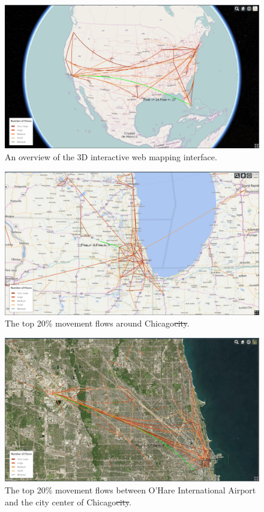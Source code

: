 \documentclass[ijgi,article,accept,moreauthors,pdftex,10pt,a4paper]{mdpi}
\theoremstyle{mdpi}
\newcounter{re}
\theoremstyle{mdpidefinition}
\providecommand{\DIFadd}[1]{{\protect\color{blue}\uwave{#1}}} %
\providecommand{\DIFdel}[1]{{\protect\color{red}\sout{#1}}}                      %
\providecommand{\DIFaddFL}[1]{\DIFadd{#1}} %
\providecommand{\DIFdelFL}[1]{\DIFdel{#1}} %
\providecommand{\DIFaddbeginFL}{} %
\providecommand{\DIFaddendFL}{} %
\providecommand{\DIFdelbeginFL}{} %
\providecommand{\DIFdelendFL}{} %
\begin{document}
\begin{figure}[ht]
\centering
\includegraphics[width=0.8\linewidth]{./figures/all}
\caption{An overview of the 3D interactive web mapping interface.}
\label{fig:Web_Interface}
\end{figure}
\FloatBarrier

\begin{figure}[ht]
\centering
\includegraphics[width=0.8\linewidth]{./figures/Chicago}
\caption{The top 20$\%$ movement flows around Chicago\DIFdelbeginFL \DIFdelFL{city}\DIFdelendFL .}
\label{fig:chicago}
\end{figure}
\FloatBarrier

\begin{figure}[ht]
\centering
\includegraphics[width=0.8\linewidth]{./figures/Chicago_airport}
\caption{The top 20$\%$ movement flows between \DIFaddbeginFL \DIFaddFL{the }\DIFaddendFL O'Hare International Airport and the city center of Chicago\DIFdelbeginFL \DIFdelFL{city}\DIFdelendFL .}
\label{fig:Chicago_airport}
\end{figure}
\FloatBarrier
\end{document}
